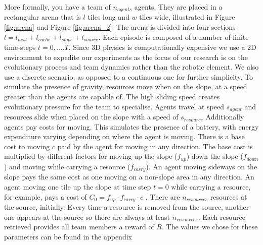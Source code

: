\documentclass[12pt]{article}
\begin{document}
\begin{appendices}
More formally, you have a team of $n_{agents}$ agents. 
They are placed in a rectangular arena that is $l$ tiles long and $w$ tiles wide, illustrated in Figure \ref{fig:arena} and Figure \ref{fig:arena_2}. 
The arena is divided into four sections $l= l_{nest} + l_{cache} + l_{slope} + l_{source}$.
Each episode is composed of a number of finite time-steps $t=0, .... T$. 
Since 3D physics is computationally expensive we use a 2D environment to expedite our experiments as the focus of our research is on the evolutionary process and team dynamics rather than the robotic element.
We also use a discrete scenario, as opposed to a continuous one for further simplicity.
To simulate the presence of gravity, resources move when on the slope, at a speed greater than the agents are capable of.
The high sliding speed creates evolutionary pressure for the team to specialise.
Agents travel at speed $s_{agent}$ and resources slide when placed on the slope with a speed of $s_{resource}$ 
Additionally agents pay costs for moving.
This simulates the presence of a battery, with energy expenditure varying depending on where the agent is moving.
There is a base cost to moving $c$ paid by the agent for moving in any direction.
The base cost is multiplied by different factors for moving up the slope ($f_{up}$) down the slope ($f_{down}$) and moving while carrying a resource ($f_{carry}$). 
An agent moving sideways on the slope pays the same cost as one moving on a non-slope area in any direction.
An agent moving one tile up the slope at time step $t=0$ while carrying a resource, for example, pays a cost of $C_{0} = f_{up} \cdot f_{carry} \cdot c$ .
There are $n_{resources}$ resources at the source, initially.
Every time a resource is removed from the source, another one appears at the source so there are always at least $n_{resources}$.
Each resource retrieved provides all team members a reward of $R$.
The values we chose for these parameters can be found in the appendix\\


\end{appendices}
\end{document}
